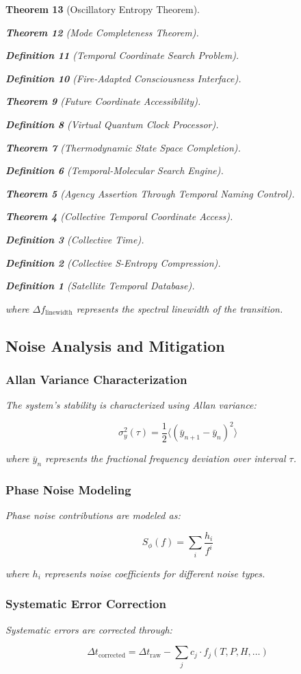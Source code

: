 \documentclass[12pt,a4paper]{article}
\newtheorem{theorem}{Theorem}[section]
\newtheorem{definition}[theorem]{Definition}
\begin{document}
\begin{theorem}[Oscillatory Entropy Theorem]
\begin{theorem}[Mode Completeness Theorem]
\begin{enumerate}
\begin{definition}[Temporal Coordinate Search Problem]
\begin{algorithm}
\begin{definition}[Fire-Adapted Consciousness Interface]
\begin{theorem}[Future Coordinate Accessibility]
\begin{definition}[Virtual Quantum Clock Processor]
\begin{itemize}
\begin{itemize}
\begin{theorem}[Thermodynamic State Space Completion]
\begin{definition}[Temporal-Molecular Search Engine]
\begin{theorem}[Agency Assertion Through Temporal Naming Control]
\begin{remark}
\begin{theorem}[Collective Temporal Coordinate Access]
\begin{definition}[Collective Time]
\begin{definition}[Collective S-Entropy Compression]
\begin{definition}[Satellite Temporal Database]
\begin{algorithm}
\begin{table}[h]
{{where $\Delta f_{\text{linewidth}}$ represents the spectral linewidth of the transition.

\subsection{Noise Analysis and Mitigation}

\subsubsection{Allan Variance Characterization}

The system's stability is characterized using Allan variance:

\begin{equation}
\sigma_y^2(\tau) = \frac{1}{2} \langle (\bar{y}_{n+1} - \bar{y}_n)^2 \rangle
\end{equation}

where $\bar{y}_n$ represents the fractional frequency deviation over interval $\tau$.

\subsubsection{Phase Noise Modeling}

Phase noise contributions are modeled as:

\begin{equation}
S_\phi(f) = \sum_{i} \frac{h_i}{f^i}
\end{equation}

where $h_i$ represents noise coefficients for different noise types.

\subsubsection{Systematic Error Correction}

Systematic errors are corrected through:

\begin{equation}
\Delta t_{\text{corrected}} = \Delta t_{\text{raw}} - \sum_{j} c_j \cdot f_j(T, P, H, \ldots)
\end{equation}

}}
\end{table}
\end{algorithm}
\end{definition}
\end{definition}
\end{definition}
\end{theorem}
\end{remark}
\end{theorem}
\end{definition}
\end{theorem}
\end{itemize}
\end{itemize}
\end{definition}
\end{theorem}
\end{definition}
\end{algorithm}
\end{definition}
\end{enumerate}
\end{theorem}
\end{theorem}
\end{document}
